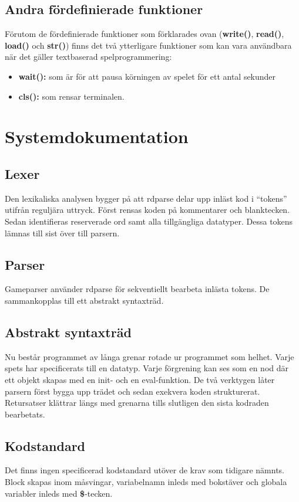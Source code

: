 \documentclass{Dokumentmall}
\begin{document}
\subsection{Andra fördefinierade funktioner}
Förutom de fördefinierade funktioner som förklarades ovan (\textbf{write()}, \textbf{read()}, \textbf{load()} och \textbf{str()}) finns det två ytterligare funktioner som kan vara användbara när det gäller textbaserad spelprogrammering:

\begin{itemize}  
\item \textbf{wait():} som är för att pausa körningen av spelet för ett antal sekunder
\item \textbf{cls():} som rensar terminalen.
\end{itemize}

\newpage
\section{Systemdokumentation}
\subsection{Lexer}
Den lexikaliska analysen bygger på att rdparse delar upp inläst kod i “tokens” utifrån reguljära uttryck. Först rensas koden på kommentarer och blanktecken. Sedan identifieras reserverade ord samt alla tillgängliga datatyper. Dessa tokens lämnas till sist över till parsern.

\subsection{Parser}
Gameparser använder rdparse för sekventiellt bearbeta inlästa tokens. De sammankopplas till ett abstrakt syntaxträd.

\subsection{Abstrakt syntaxträd}
Nu består programmet av långa grenar rotade ur programmet som helhet. Varje spets har specificerats till en datatyp. Varje förgrening kan ses som en nod där ett objekt skapas med en init- och en eval-funktion. De två verktygen låter parsern först bygga upp trädet och sedan exekvera koden strukturerat. Retursatser klättrar längs med grenarna tills slutligen den sista kodraden bearbetats.

\subsection{Kodstandard}
Det finns ingen specificerad kodstandard utöver de krav som tidigare nämnts. Block skapas inom måsvingar, variabelnamn inleds med bokstäver och globala variabler inleds med \textbf{\$}-tecken.
\end{document}
